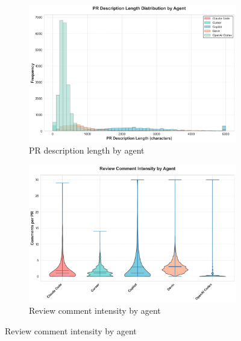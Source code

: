 \documentclass[11pt]{article}
\begin{document}
\begin{figure}[H]
\begin{subfigure}[b]{0.48\textwidth}
\centering
\includegraphics[width=\textwidth]{figures_individual/33_entity_pr_description_length_by_agent.png}
\caption{PR description length by agent}
\label{fig:entity_pr_desc}
\end{subfigure}
\hfill
\begin{subfigure}[b]{0.48\textwidth}
\centering
\includegraphics[width=\textwidth]{figures_individual/34_entity_review_comment_intensity_by_agent.png}
\caption{Review comment intensity by agent}
\label{fig:entity_comments}
\end{subfigure}

\vspace{0.3cm}


\end{figure}
\end{document}
